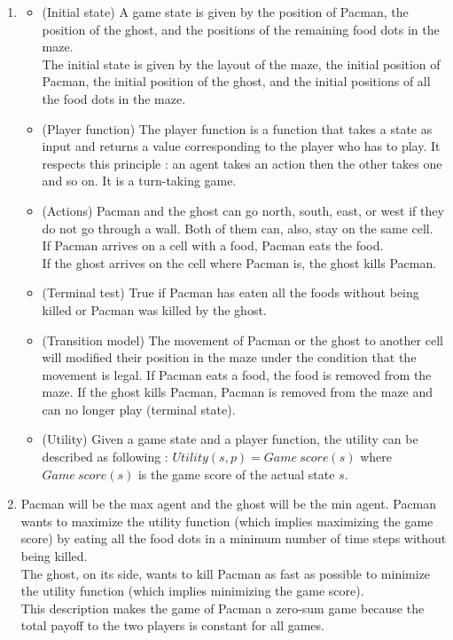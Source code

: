 \documentclass{article}
\begin{document}
\begin{enumerate}[label=\alph*.,leftmargin=*]
    \item
    	\begin{itemize}
    		\item (Initial state) A game state is given by the position of Pacman, the position of the ghost, and the positions of the remaining food dots in the maze.\\
    		The initial state is given by the layout of the maze, the initial position of Pacman, the initial position of the ghost, and the initial positions of all the food dots in the maze.
    		
    		\item (Player function) The player function is a function that takes a state as input and returns a value corresponding to the player who has to play. It respects this principle : an agent takes an action then the other takes one and so on. It is a turn-taking game.
    		
    		\item (Actions) Pacman and the ghost can go north, south, east, or west if they do not go through a wall. Both of them can, also, stay on the same cell.\\
    		If Pacman arrives on a cell with a food, Pacman eats the food.\\
    		If the ghost arrives on the cell where Pacman is, the ghost kills Pacman.
    		
    		\item (Terminal test) True if Pacman has eaten all the foods without being killed or Pacman was killed by the ghost.
    		
    		\item (Transition model) The movement of Pacman or the ghost to another cell will modified their position in the maze under the condition that the movement is legal. If Pacman eats a food, the food is removed from the maze. If the ghost kills Pacman, Pacman is removed from the maze and can no longer play (terminal state).
			
			\item (Utility) Given a game state and a player function, the utility can be described as following : $Utility(s, p) = Game \ score(s)$ where $Game \ score(s)$ is the game score of the actual state $s$.
    	\end{itemize}
    	
    \item Pacman will be the max agent and the ghost will be the min agent. Pacman wants to maximize the utility function (which implies maximizing the game score) by eating all the food dots in a minimum number of time steps without being killed.\\
          The ghost, on its side, wants to kill Pacman as fast as possible to minimize the utility function (which implies minimizing the game score).\\
          This description makes the game of Pacman a zero-sum game because the total payoff to the two players is constant for all games.
\end{enumerate}
\end{document}
